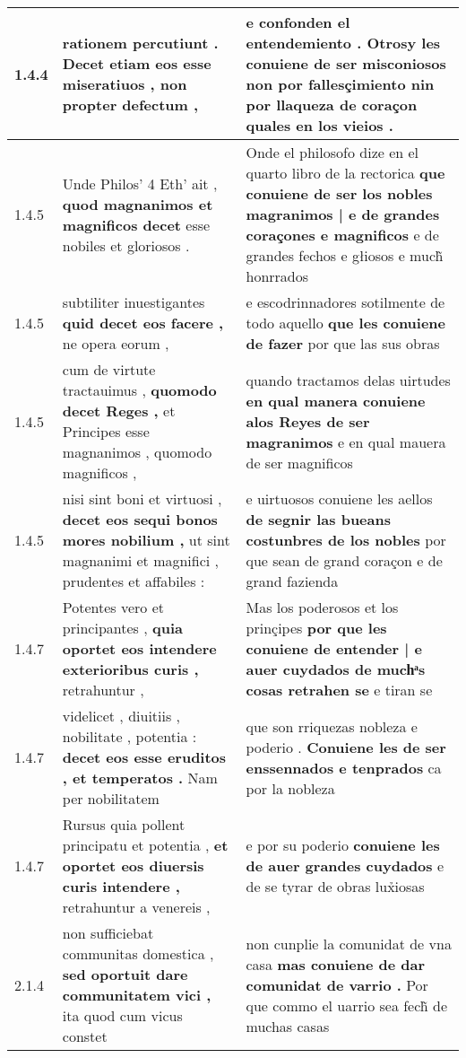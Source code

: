 \begin{tabular}{|p{1cm}|p{6.5cm}|p{6.5cm}|}
1.4.4 & rationem percutiunt . \textbf{ Decet etiam eos esse miseratiuos , } non propter defectum , & e confonden el entendemiento . \textbf{ Otrosy les conuiene de ser misconiosos non por fallesçimiento nin por llaqueza de } coraçon quales en los vieios . \\\hline
1.4.5 & Unde Philos’ 4 Eth’ ait , \textbf{ quod magnanimos et magnificos decet } esse nobiles et gloriosos . & Onde el philosofo dize en el quarto libro de la rectorica \textbf{ que conuiene de ser los nobles magranimos | e de grandes coraçones e magnificos } e de grandes fechos e głiosos e much̃ honrrados \\\hline
1.4.5 & subtiliter inuestigantes \textbf{ quid decet eos facere , } ne opera eorum , & e escodrinnadores sotilmente de todo aquello \textbf{ que les conuiene de fazer } por que las sus obras \\\hline
1.4.5 & cum de virtute tractauimus , \textbf{ quomodo decet Reges , } et Principes esse magnanimos , quomodo magnificos , & quando tractamos delas uirtudes \textbf{ en qual manera conuiene alos Reyes de ser magranimos } e en qual mauera de ser magnificos \\\hline
1.4.5 & nisi sint boni et virtuosi , \textbf{ decet eos sequi bonos mores nobilium , } ut sint magnanimi et magnifici , prudentes et affabiles : & e uirtuosos conuiene les aellos \textbf{ de segnir las bueans costunbres de los nobles } por que sean de grand coraçon e de grand fazienda \\\hline
1.4.7 & Potentes vero et principantes , \textbf{ quia oportet eos intendere exterioribus curis , } retrahuntur , & Mas los poderosos et los prinçipes \textbf{ por que les conuiene de entender | e auer cuydados de muchͣs cosas retrahen se } e tiran se \\\hline
1.4.7 & videlicet , diuitiis , nobilitate , potentia : \textbf{ decet eos esse eruditos , et temperatos . } Nam per nobilitatem & que son rriquezas nobleza e poderio . \textbf{ Conuiene les de ser enssennados e tenprados } ca por la nobleza \\\hline
1.4.7 & Rursus quia pollent principatu et potentia , \textbf{ et oportet eos diuersis curis intendere , } retrahuntur a venereis , & e por su poderio \textbf{ conuiene les de auer grandes cuydados } e de se tyrar de obras lux̉iosas \\\hline
2.1.4 & non sufficiebat communitas domestica , \textbf{ sed oportuit dare communitatem vici , } ita quod cum vicus constet & non cunplie la comunidat de vna casa \textbf{ mas conuiene de dar comunidat de varrio . } Por que commo el uarrio sea fech̃ de muchas casas \\\hline

\end{tabular}
